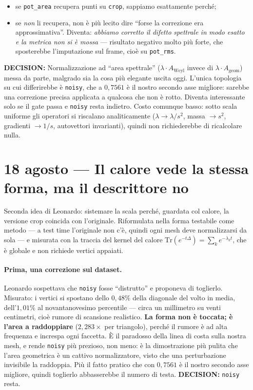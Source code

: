 \documentclass[11pt,a4paper]{article}
\newcommand{\decision}[1]{\textcolor{decision}{\textbf{DECISION:}} #1}
\begin{document}
\begin{itemize}
\item se \texttt{pot\_area} recupera punti su \texttt{crop}, sappiamo esattamente perch\'e;
\item se \emph{non} li recupera, non \`e pi\`u lecito dire ``forse la correzione era
      approssimativa''. Diventa: \emph{abbiamo corretto il difetto spettrale in modo esatto e la
      metrica non si \`e mossa} --- risultato negativo molto pi\`u forte, che sposterebbe
      l'imputazione sul frame, cio\`e su \texttt{pot\_rms}.
\end{itemize}

\decision{Normalizzazione ad ``area spettrale'' ($\lambda \cdot A_{\mathrm{Weyl}}$ invece di
$\lambda \cdot A_{\mathrm{geom}}$) messa da parte, malgrado sia la cosa pi\`u elegante uscita
oggi. L'unica topologia su cui differirebbe \`e \texttt{noisy}, che a $0{,}7561$ \`e il nostro
secondo asse migliore: sarebbe una correzione precisa applicata a qualcosa che non \`e rotto.
Diventa interessante solo se il gate passa e \texttt{noisy} resta indietro. Costo comunque
basso: sotto scala uniforme gli operatori si riscalano analiticamente ($\lambda \to \lambda/s^2$,
massa $\to s^2$, gradienti $\to 1/s$, autovettori invarianti), quindi non richiederebbe di
ricalcolare nulla.}


\section{18 agosto --- Il calore vede la stessa forma, ma il descrittore no}

Seconda idea di Leonardo: sistemare la scala perch\'e, guardata col calore, la versione crop
coincida con l'originale. Riformulata nella forma testabile come metodo --- a test time
l'originale non c'\`e, quindi ogni mesh deve normalizzarsi da sola --- e misurata con la traccia
del kernel del calore $\mathrm{Tr}(e^{-t\Delta}) = \sum_k e^{-\lambda_k t}$, che \`e globale e
non richiede vertici appaiati.

\paragraph{Prima, una correzione sul dataset.} Leonardo sospettava che \texttt{noisy} fosse
``distrutto'' e proponeva di toglierlo. Misurato: i vertici si spostano dello $0{,}48\%$ della
diagonale del volto in media, dell'$1{,}01\%$ al novantanovesimo percentile --- circa un
millimetro su venti centimetri, cio\`e rumore di scansione realistico. \textbf{La forma non \`e
toccata; \`e l'area a raddoppiare} ($2{,}283\times$ per triangolo), perch\'e il rumore \`e ad
alta frequenza e increspa ogni faccetta. \`E il paradosso della linea di costa sulla nostra
mesh, e rende \texttt{noisy} pi\`u prezioso, non meno: \`e la dimostrazione pi\`u pulita che
l'area geometrica \`e un cattivo normalizzatore, visto che una perturbazione invisibile la
raddoppia. Pi\`u il fatto pratico che con $0{,}7561$ \`e il nostro secondo asse migliore, quindi
toglierlo abbasserebbe il numero di testa. \decision{\texttt{noisy} resta.}
\end{document}
